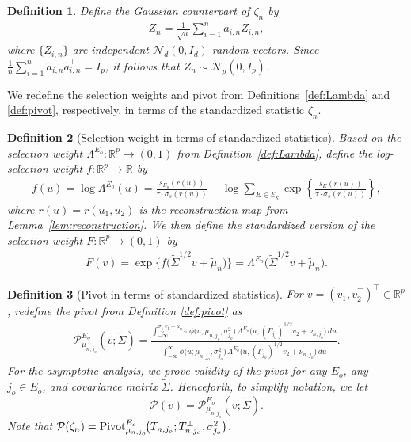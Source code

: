 \documentclass[12pt]{article}
\newcommand{\Pivot}{\text{\normalfont Pivot}}
\newtheorem{definition}{Definition}[section]
\newcommand{\real}{\mathbb{R}}
\newcommand{\cP}{{\mathcal{P}}}
\newcommand{\snoise}{\sigma_{s}}
\begin{document}
\begin{appendices}
\begin{definition}
Define the Gaussian counterpart of $\zeta_n$ by 
\begin{align}
\label{eq:Zn}
Z_n=\frac{1}{\sqrt n}\sum_{i=1}^n\widetilde a_{i,n}Z_{i,n},
\end{align} 
where $\{Z_{i,n}\}$ are independent $\mathcal N_d(0,I_d)$ random vectors. 
Since $\frac1n\sum_{i=1}^n\widetilde a_{i,n}\widetilde a_{i,n}^\top=I_p$, it follows that $Z_n\sim\mathcal N_p(0,I_p)$.
\end{definition}



We redefine the selection weights and pivot from Definitions~\ref{def:Lambda} and \ref{def:pivot}, respectively, in terms of the standardized statistic $\zeta_n$.

\begin{definition}[Selection weight in terms of standardized statistics]
\label{def:weights-std}
Based on the selection weight $\Lambda^{E_o}:\real^p\to(0,1)$ from Definition~\ref{def:Lambda}, define the log-selection weight $f:\real^p\to\real$ by
\begin{align}
  \label{eq:f}
  f(u)
  =\log\Lambda^{E_o}(u)
  =\frac{s_{E_o}(r(u))}{\tau\cdot\snoise(r(u))}
   -\log\sum_{E\in\mathcal E_k}
     \exp\!\left\{\frac{s_E(r(u))}{\tau\cdot\snoise(r(u))}\right\},
\end{align}
where $r(u)=r(u_1,u_2)$ is the reconstruction map from Lemma~\ref{lem:reconstruction}. We then define the standardized version of the selection weight $F:\real^p\to(0,1)$ by
\begin{align}
  \label{eq:F}
  F(v)
  =\exp\!\big\{f\big(\widetilde\Sigma^{1/2}v+\widetilde\mu_n\big)\big\}
  =\Lambda^{E_o}\!\big(\widetilde\Sigma^{1/2}v+\widetilde\mu_n\big).
\end{align} 
\end{definition}

\begin{definition}[Pivot in terms of standardized statistics]
\label{def:pivot-std}
For $v=(v_1,v_2^\top)^\top\in\real^p$, redefine the pivot from Definition \ref{def:pivot} as
\begin{align*}
  \cP^{E_o}_{\mu_{n,j_o}}(v;\widetilde\Sigma)
  =
  \frac{
    \int_{-\infty}^{\sigma_{j_o}v_1+\mu_{n,j_o}}
    \phi\big(u;\mu_{n,j_o},\sigma_{j_o}^2\big)\,
    \Lambda^{E_o}\!\big(u,(\Gamma_{j_o})^{1/2}v_2+\nu_{n,j_o}\big)\,du
  }{
    \int_{-\infty}^{\infty}
    \phi\big(u;\mu_{n,j_o},\sigma_{j_o}^2\big)\,
    \Lambda^{E_o}\!\big(u,(\Gamma_{j_o})^{1/2}v_2+\nu_{n,j_o}\big)\,du
  }.
\end{align*}
For the asymptotic analysis, we prove validity of the pivot for any $E_o$, any $j_o\in E_o$, and covariance matrix $\widetilde\Sigma$. 
Henceforth, to simplify notation, we let
\begin{equation}
    \label{eq:pivot-std}
    \cP(v)= \cP^{E_o}_{\mu_{n,j_o}}(v;\widetilde\Sigma).
\end{equation} Note that $\cP(\zeta_n)=\Pivot^{E_o}_{\mu_{n,j_o}}\!\big(T_{n,j_o};T_{n,j_o}^\perp,\sigma_{j_o}^2\big)$.
\end{definition}


\end{appendices}
\end{document}
